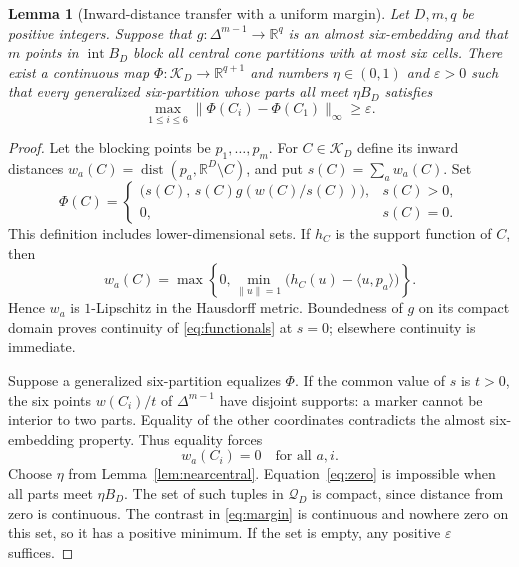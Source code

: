 \documentclass[a4paper,11pt,reqno]{amsart}
\newcommand{\R}{\mathbb R}
\newcommand{\intt}{\operatorname{int}}
\newcommand{\dist}{\operatorname{dist}}
\newtheorem{lemma}[theorem]{Lemma}
\theoremstyle{definition}
\theoremstyle{remark}
\numberwithin{equation}{section}
\begin{document}
\begin{lemma}[Inward-distance transfer with a uniform margin]\label{lem:transfer}
Let $D,m,q$ be positive integers. Suppose that
$g:\Delta^{m-1}\to\R^q$ is an almost six-embedding and that
$m$ points in $\intt B_D$ block all central cone partitions with
at most six cells. There exist a continuous map
$\Phi:\mathcal K_D\to\R^{q+1}$ and numbers $\eta\in(0,1)$ and
$\varepsilon>0$ such that every generalized six-partition whose
parts all meet $\eta B_D$ satisfies
\begin{equation}\label{eq:margin}
                  \max_{1\le i\le6}\|\Phi(C_i)-\Phi(C_1)\|_\infty
                     \ge\varepsilon.
\end{equation}
\end{lemma}
\begin{proof}
Let the blocking points be $p_1,\ldots,p_m$. For $C\in\mathcal K_D$
define its inward distances $w_a(C)=\dist(p_a,\R^D\setminus C)$,
and put $s(C)=\sum_a w_a(C)$. Set
\begin{equation}\label{eq:functionals}
 \Phi(C)=
 \begin{cases}
 \bigl(s(C),\,s(C)g(w(C)/s(C))\bigr),&s(C)>0,\\
 0,&s(C)=0.
 \end{cases}
\end{equation}
This definition includes lower-dimensional sets. If $h_C$ is the
support function of $C$, then
\begin{equation}\label{eq:inward}
 w_a(C)=\max\left\{0,\min_{\|u\|=1}
                    \bigl(h_C(u)-\langle u,p_a\rangle\bigr)\right\}.
\end{equation}
Hence $w_a$ is $1$-Lipschitz in the Hausdorff metric. Boundedness of
$g$ on its compact domain proves continuity of \eqref{eq:functionals}
at $s=0$; elsewhere continuity is immediate.

Suppose a generalized six-partition equalizes $\Phi$. If the common
value of $s$ is $t>0$, the six points $w(C_i)/t$ of
$\Delta^{m-1}$ have disjoint supports: a marker cannot be interior
to two parts. Equality of the other coordinates contradicts the
almost six-embedding property. Thus equality forces
\begin{equation}\label{eq:zero}
                         w_a(C_i)=0\quad\text{for all }a,i.
\end{equation}
Choose $\eta$ from Lemma~\ref{lem:nearcentral}. Equation~\eqref{eq:zero}
is impossible when all parts meet $\eta B_D$. The set of such tuples
in $\mathcal Q_D$ is compact, since distance from zero is continuous.
The contrast in \eqref{eq:margin} is continuous and nowhere zero on
this set, so it has a positive minimum. If the set is empty, any
positive $\varepsilon$ suffices.
\end{proof}
\end{document}

